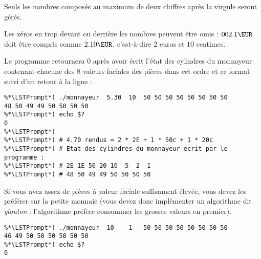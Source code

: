 \medskip

\noindent Seuls les nombres composés au maximum de deux chiffres après la virgule seront gérés.

\medskip

\noindent Les zéros en trop devant ou derrière les nombres peuvent être omis : $ 002.1 \EUR $ doit être compris comme $ 2.10 \EUR $, c'est-à-dire  $ 2 $ euros et $ 10 $ centimes.

\medskip

\noindent Le programme retournera $ 0 $ après avoir écrit l'état des cylindres du monnayeur contenant chacune des 8 valeurs faciales des pièces dans cet ordre et ce format suivi d'un retour à la ligne :

\medskip

\noindent {}

\bigskip

\begin{lstlisting}[frame=single,title={Cas général : insertion de 5.30€ pour un produit à 10€, en rendant 4.70€}]
%*\LSTPrompt*) #            sum  cost 2E 1E 50 20 10  5  2  1
%*\LSTPrompt*) ./monnayeur  5.30  10  50 50 50 50 50 50 50 50
48 50 49 49 50 50 50 50
%*\LSTPrompt*) echo $?
0
%*\LSTPrompt*)
%*\LSTPrompt*) # 4.70 rendus = 2 * 2E + 1 * 50c + 1 * 20c
%*\LSTPrompt*) # Etat des cylindres du monnayeur ecrit par le programme :
%*\LSTPrompt*) # 2E 1E 50 20 10  5  2  1
%*\LSTPrompt*) # 48 50 49 49 50 50 50 50
\end{lstlisting}



\newpage

\noindent Si vous avez assez de pièces à valeur faciale suffisament élevée, vous devez les préférer sur la petite monnaie (vous devez donc implémenter un algorithme dit \textit{glouton} : l'algorithme préfère consommer les grosses valeurs en premier).

\bigskip

\begin{lstlisting}[frame=single,title={Cas général : insertion de 10€ pour un produit à 1€, en rendant 9€}]
%*\LSTPrompt*) #            sum  cost 2E 1E 50 20 10  5  2  1
%*\LSTPrompt*) ./monnayeur  10    1   50 50 50 50 50 50 50 50
46 49 50 50 50 50 50 50
%*\LSTPrompt*) echo $?
0
\end{lstlisting}

